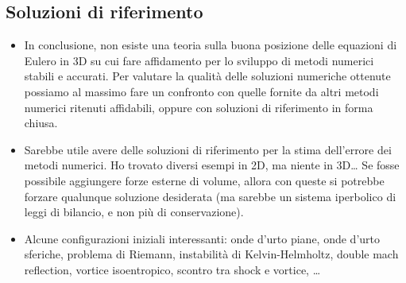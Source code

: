 \subsection*{Soluzioni di riferimento}

\begin{itemize}
\item In conclusione, non esiste una teoria sulla buona posizione delle
	equazioni di Eulero in 3D su cui fare affidamento per
	lo sviluppo di metodi numerici stabili e accurati.
	Per valutare la qualità delle soluzioni numeriche ottenute
	possiamo al massimo fare un confronto con quelle fornite da altri metodi numerici
	ritenuti affidabili, oppure con soluzioni di riferimento in forma chiusa.
\item Sarebbe utile avere delle soluzioni di riferimento per la stima
	dell'errore dei metodi numerici.
	Ho trovato diversi esempi in 2D, ma niente in 3D\dots
	Se fosse possibile aggiungere forze esterne di volume, allora
	con queste si potrebbe forzare qualunque soluzione desiderata
	(ma sarebbe un sistema iperbolico di leggi di bilancio,
	e non più di conservazione).
\item Alcune configurazioni iniziali interessanti: onde d'urto piane,
	onde d'urto sferiche, problema di Riemann, instabilità di Kelvin-Helmholtz,
	double mach reflection, vortice isoentropico, scontro tra shock e vortice, \dots
\end{itemize}

